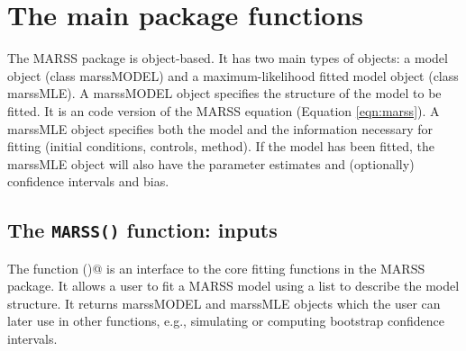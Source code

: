 \chapter{The main package functions}
\label{chap:mainfunctions}
The MARSS package is object-based.  It has two main types of objects: a model object (class marssMODEL) and a maximum-likelihood fitted model object (class marssMLE). A marssMODEL object specifies the structure of the model to be fitted.  It is an \R code version of the MARSS equation (Equation \ref{eqn:marss}).  A marssMLE object specifies both the model and the information necessary for fitting (initial conditions, controls, method).  If the model has been fitted, the marssMLE object will also have the parameter estimates and (optionally) confidence intervals and bias.  

\section{The \texttt{MARSS()} function: inputs}
The function \verb@MARSS()@ is an interface to the core fitting functions in the MARSS package.  It allows a user to fit a MARSS model using a list to describe the model structure.  It returns marssMODEL and marssMLE objects which the user can later use in other functions, e.g., simulating or computing bootstrap confidence intervals.

